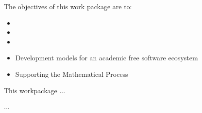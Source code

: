 \begin{workpackage}[id=social-aspects,wphases=12-24!.5,
  title=Social Aspects,
  UORM=1]


\begin{wpobjectives}
The objectives of this work package are to:
\begin{itemize}
\item
\item
\item
\item Development models for an academic free software ecosystem
\item Supporting the Mathematical Process
\end{itemize}
\end{wpobjectives}

\begin{wpdescription}
This workpackage  ...
\end{wpdescription}


\begin{wpdelivs}
  \begin{wpdeliv}[due=12,id=social_...,dissem=??,nature=??]
      {...}
\end{wpdeliv}
\end{wpdelivs}
\end{workpackage}
